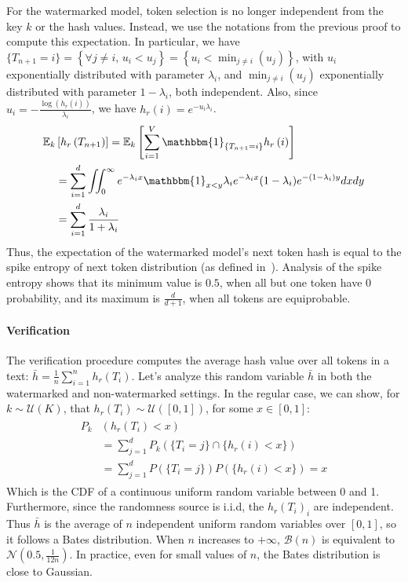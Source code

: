 For the watermarked model, token selection is no longer independent from the key $k$ or 
the hash values. Instead, we use the notations from the previous proof to compute this 
expectation. In particular, we have 
$\{T_{n+1}=i\} = \left\{ \forall j \neq i,\, u_i < u_j \right\} = \left\{ u_i < \min_{j \neq i}(u_j) \right\} $, 
with $u_i$ exponentially distributed with parameter $\lambda_i$, and $\min_{j \neq i}(u_j)$ 
exponentially distributed with parameter $1-\lambda_i$, both independent. Also, 
since $u_i = -\frac{\log(h_r(i))}{\lambda_i}$, we have $h_r(i) = e^{-u_i \lambda_i}$.
%
\begin{align}
    \begin{split}
        \mathbb{E}_k&\left[ h_r\left(T_{n+1}\right) \right] = \mathbb{E}_k\left[ \sum_{i=1}^V \mathbbm{1}_{\{T_{n+1} = i\}} h_r\left(i\right) \right]\\
        &= \sum_{i=1}^d \iint_0^{\infty} e^{-\lambda_i x} \mathbbm{1}_{x < y} \lambda_i e^{-\lambda_i x} (1-\lambda_i) e^{-(1-\lambda_i) y} dx dy\\
        &= \sum_{i=1}^d \frac{\lambda_i}{1 + \lambda_i}
    \end{split}
\end{align}
Thus, the expectation of the watermarked model's next token hash is equal to the spike entropy of next token distribution (as defined in~\cite{kirchenbauer_watermark_2023}). Analysis of the spike entropy shows that its minimum value is $0.5$, when all but one token have 0 probability, and its maximum is $\frac{d}{d+1}$, when all tokens are equiprobable.

\paragraph{Verification}
The verification procedure computes the average hash value over all tokens in a text: $\bar{h} = \frac{1}{n} \sum_{i=1}^{n} h_r\left(T_{i}\right)$.
%
Let's analyze this random variable $\bar{h}$ in both the watermarked and non-watermarked settings. 
%
In the regular case, we can show, for $k \sim \mathcal{U}(K)$, that $h_r\left(T_{i}\right) \sim \mathcal{U}([0,1])$, for some $x \in [0,1]$:
\begin{align}
\begin{split}
P_k&\left( h_r\left(T_{i}\right) < x \right) \\
&= \sum_{j=1}^d P_k\left( \{T_i = j\} \cap \{h_r\left(i\right) < x \}\right) \\
&= \sum_{j=1}^d P\left( \{T_i = j\} \right) P\left(\{h_r\left(i\right) < x\}\right) = x
\end{split}
\end{align}
Which is the CDF of a continuous uniform random variable between 0 and 1.
%
Furthermore, since the randomness source is i.i.d, the ${h_r(T_i)}_i$ are independent.
%
Thus $\bar{h}$ is the average of $n$ independent uniform random variables over 
$[0,1]$, so it follows a Bates distribution. When $n$ increases to $+\infty$, 
$\mathcal{B}(n)$ is equivalent to $\mathcal{N}(0.5, \frac{1}{12n})$. In practice, 
even for small values of $n$, the Bates distribution is close to Gaussian.

